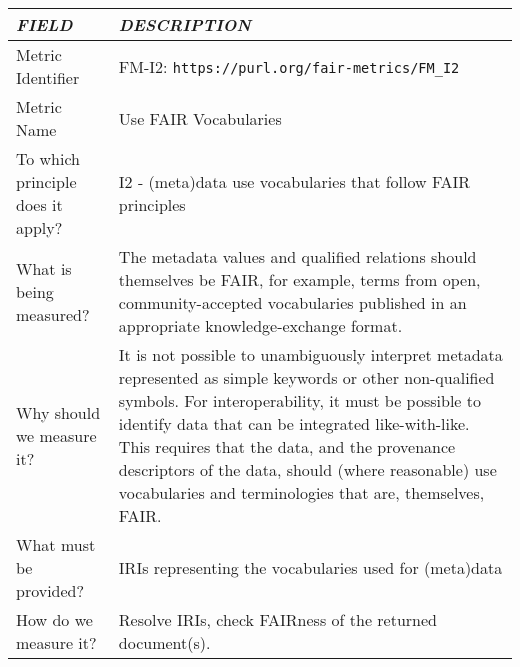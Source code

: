 \documentclass[english]{article}
\begin{document}
\begin{longtable}{|p{5cm}|p{9cm}|}


\hline
\emph{FIELD} & \emph{DESCRIPTION} \\
\hline
Metric Identifier &   FM-I2: \verb"https://purl.org/fair-metrics/FM_I2"
\\


\hline
Metric Name &   


Use FAIR Vocabularies


 \\



\hline
To which principle does it apply? &   




I2 - (meta)data use vocabularies that follow FAIR principles

\\



\hline
What is being measured? & 




The metadata values and qualified relations should themselves be FAIR, for example, terms from open, community-accepted vocabularies published in an appropriate knowledge-exchange format.


\\



\hline
Why should we measure it? & 





It is not possible to unambiguously interpret metadata represented as simple keywords or other non-qualified symbols.  For interoperability, it must be possible to identify data that can be integrated like-with-like.  This requires that the data, and the provenance descriptors of the data, should (where reasonable) use vocabularies and terminologies that are, themselves, FAIR.
  
\\



\hline
What must be provided? &  


IRIs representing the vocabularies used for (meta)data 


\\



\hline
How do we measure it? &  


Resolve IRIs, check FAIRness of the returned document(s).



\end{longtable}
\end{document}
